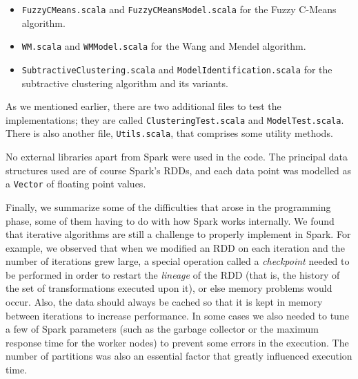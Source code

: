 \begin{itemize}
  \item \verb|FuzzyCMeans.scala| and \verb|FuzzyCMeansModel.scala| for the Fuzzy C-Means algorithm.
  \item \verb|WM.scala| and \verb|WMModel.scala| for the Wang and Mendel algorithm.
  \item \verb|SubtractiveClustering.scala| and \verb|ModelIdentification.scala| for the subtractive clustering algorithm and its variants.
\end{itemize}
As we mentioned earlier, there are two additional files to test the implementations; they are called \verb|ClusteringTest.scala| and \verb|ModelTest.scala|. There is also another file, \verb|Utils.scala|, that comprises some utility methods.

No external libraries apart from Spark were used in the code. The principal data structures used are of course Spark's RDDs, and each data point was modelled as a \verb|Vector| of floating point values.

Finally, we summarize some of the difficulties that arose in the programming phase, some of them having to do with how Spark works internally. We found that iterative algorithms are still a challenge to properly implement in Spark. For example, we observed that when we modified an RDD on each iteration and the number of iterations grew large, a special operation called a \textit{checkpoint} needed to be performed in order to restart the \textit{lineage} of the RDD (that is, the history of the set of transformations executed upon it), or else memory problems would occur. Also, the data should always be cached so that it is kept in memory between iterations to increase performance. In some cases we also needed to tune a few of Spark parameters (such as the garbage collector or the maximum response time for the worker nodes) to prevent some errors in the execution. The number of partitions was also an essential factor that greatly influenced execution time.
